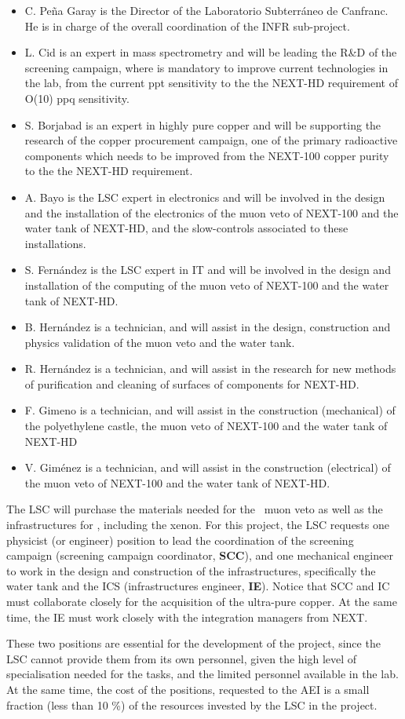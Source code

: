 \begin{itemize}[noitemsep,topsep=0pt,parsep=0pt,partopsep=0pt]
\item C. Peña Garay is the Director of the Laboratorio Subterr\'aneo de Canfranc. He is in charge of the overall coordination of the INFR sub-project.
\item L. Cid is an expert in mass spectrometry and will be leading the R\&D of the screening campaign, where is mandatory to improve current 
technologies in the lab, from the current ppt sensitivity to the the NEXT-HD requirement of O(10) ppq sensitivity.
\item  S. Borjabad is an expert in highly pure copper and will be supporting the research of the copper procurement campaign, one of the primary 
radioactive components which needs to be improved from the NEXT-100 copper purity to the the NEXT-HD requirement.
\item A. Bayo is the LSC expert in electronics and will be involved in the design and the installation of the electronics of the muon veto 
of NEXT-100 and the water tank of NEXT-HD, and the slow-controls associated to these installations.
\item S. Fern\'andez is the LSC expert in IT and will be involved in the design and installation of the computing of the muon veto of NEXT-100 
and the water tank of NEXT-HD.
\item B. Hern\'andez  is a technician, and will assist in the design, construction and physics validation of the muon veto and the water tank.
\item R. Hern\'andez  is a technician, and will assist in the research for new methods of purification and cleaning of surfaces of components for NEXT-HD.  
\item F. Gimeno is a technician, and will assist in the construction (mechanical) of the polyethylene castle, the muon veto of NEXT-100 and 
the water tank of NEXT-HD
\item V. Gim\'enez is a technician, and will assist in the construction (electrical) of the muon veto of NEXT-100 and the water tank of NEXT-HD.
\end{itemize}

The LSC will purchase the materials needed for the \Next\ muon veto as well as the infrastructures for \NHD, including the xenon. For this project, the LSC requests one physicist (or engineer) position to lead the coordination of the screening campaign (screening campaign coordinator, {\bf SCC}), and one mechanical engineer to work in the design and construction of the infrastructures, specifically the water tank and the ICS (infrastructures engineer, {\bf IE}). Notice that SCC and IC must collaborate closely for the acquisition of the ultra-pure copper. At the same time, the IE must work closely with the integration managers from NEXT. 

These two positions are essential for the development of the project, since the LSC cannot provide them from its own personnel, given the high level of specialisation needed for the tasks, and the limited personnel available in the lab. At the same time, the cost of the positions, requested to the AEI is a small fraction (less than 10 \%) of the resources invested by the LSC in the project. 
  
